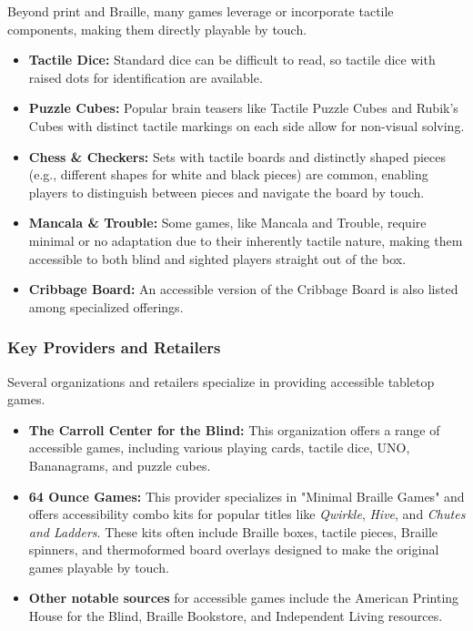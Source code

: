Beyond print and Braille, many games leverage or incorporate tactile components, making them directly playable by touch.
\begin{itemize}
    \item \textbf{Tactile Dice:} Standard dice can be difficult to read, so tactile dice with raised dots for identification are available\supercite{CarrollCenterGames}.
    \item \textbf{Puzzle Cubes:} Popular brain teasers like Tactile Puzzle Cubes and Rubik's Cubes with distinct tactile markings on each side allow for non-visual solving\supercite{CarrollCenterGames}.
    \item \textbf{Chess \& Checkers:} Sets with tactile boards and distinctly shaped pieces (e.g., different shapes for white and black pieces) are common, enabling players to distinguish between pieces and navigate the board by touch\supercite{AbilityToolboxGames}.
    \item \textbf{Mancala \& Trouble:} Some games, like Mancala and Trouble, require minimal or no adaptation due to their inherently tactile nature, making them accessible to both blind and sighted players straight out of the box\supercite{NFBBoardGames}.
    \item \textbf{Cribbage Board:} An accessible version of the Cribbage Board is also listed among specialized offerings\supercite{CarrollCenterGames}.
\end{itemize}

\subsubsection{Key Providers and Retailers}

Several organizations and retailers specialize in providing accessible tabletop games.
\begin{itemize}
    \item \textbf{The Carroll Center for the Blind:} This organization offers a range of accessible games, including various playing cards, tactile dice, UNO, Bananagrams, and puzzle cubes\supercite{CarrollCenterGames}.
    \item \textbf{64 Ounce Games:} This provider specializes in "Minimal Braille Games" and offers accessibility combo kits for popular titles like \textit{Qwirkle}, \textit{Hive}, and \textit{Chutes and Ladders}. These kits often include Braille boxes, tactile pieces, Braille spinners, and thermoformed board overlays designed to make the original games playable by touch\supercite{64OunceGames}.
    \item \textbf{Other notable sources} for accessible games include the American Printing House for the Blind, Braille Bookstore, and Independent Living resources\supercite{NFBBoardGames}.
\end{itemize}

